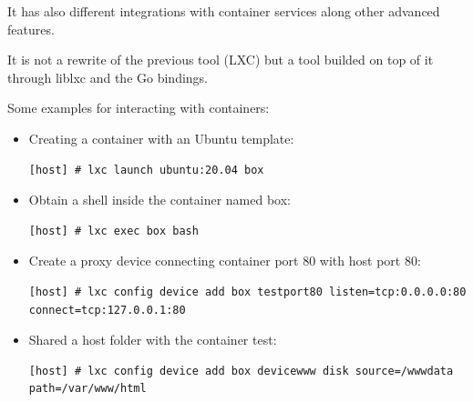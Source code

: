 It has also different integrations with container services along other advanced features.

It is not a rewrite of the previous tool (LXC) but a tool builded on top of it through liblxc and the Go bindings.

Some examples for interacting with containers:

\begin{itemize}
	\item{Creating a container with an Ubuntu template}:
	      \begin{verbatim}
[host] # lxc launch ubuntu:20.04 box
	\end{verbatim}
	\item{Obtain a shell inside the container named box:}
	      \begin{verbatim}
[host] # lxc exec box bash 
	\end{verbatim}
	\item{Create a proxy device connecting container port 80 with host port 80:}
	      \begin{verbatim}
[host] # lxc config device add box testport80 listen=tcp:0.0.0.0:80 connect=tcp:127.0.0.1:80 
	\end{verbatim}
	\item{Shared a host folder with the container test:}
	      \begin{verbatim}
[host] # lxc config device add box devicewww disk source=/wwwdata path=/var/www/html 
	\end{verbatim}
\end{itemize}




